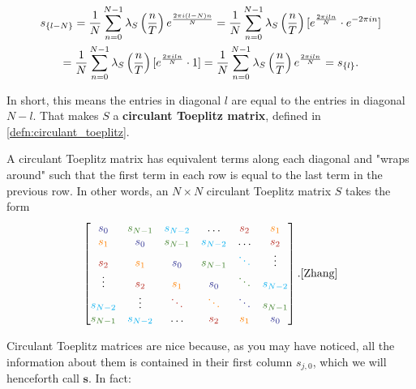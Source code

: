 \begin{multline*}
    s_{\{l-N\}} = \frac{1}{N} \sum_{n=0}^{N-1} \lambda_S\left(\frac{n}{T}\right) e^{\frac{2 \pi i (l-N)n}{N}} = \frac{1}{N} \sum_{n=0}^{N-1} \lambda_S\left(\frac{n}{T}\right)[e^{\frac{2 \pi i ln}{N}}\cdot e^{-2\pi in}] \\= \frac{1}{N} \sum_{n=0}^{N-1} \lambda_S\left(\frac{n}{T}\right)[e^{\frac{2 \pi i ln}{N}}\cdot 1] = \frac{1}{N} \sum_{n=0}^{N-1} \lambda_S\left(\frac{n}{T}\right) e^{\frac{2 \pi i ln}{N}} = s_{\{l\}}.
\end{multline*}

In short, this means the entries in diagonal $l$ are equal to the entries in diagonal $N-l$. That makes $S$ a \textbf{circulant Toeplitz matrix}, defined in \ref{defn:circulant_toeplitz}.

\begin{definition}{A circulant Toeplitz matrix has equivalent terms along each diagonal and "wraps around" such that the first term in each row is equal to the last term in the previous row. In other words, an $N\times N$ circulant Toeplitz matrix $S$ takes the form}
    $$\begin{bmatrix}
        \textcolor{Blue}{s_0} & \textcolor{OliveGreen}{s_{N-1}} & \textcolor{Cyan}{s_{N-2}} & \hdots & \textcolor{BrickRed}{s_2} & \textcolor{orange}{s_1}\\
        \textcolor{orange}{s_1} & \textcolor{Blue}{s_0} & \textcolor{OliveGreen}{s_{N-1}} & \textcolor{Cyan}{s_{N-2}} & \hdots & \textcolor{BrickRed}{s_2}\\
        \textcolor{BrickRed}{s_2} & \textcolor{orange}{s_1} & \textcolor{Blue}{s_0} & \textcolor{OliveGreen}{s_{N-1}} & \textcolor{Cyan}{\ddots} & \vdots\\
        \vdots & \textcolor{BrickRed}{s_2} & \textcolor{orange}{s_1} & \textcolor{Blue}{s_0} & \textcolor{OliveGreen}{\ddots} & \textcolor{Cyan}{s_{N-2}}\\
        \textcolor{Cyan}{s_{N-2}} & \vdots & \textcolor{BrickRed}{\ddots} & \textcolor{orange}{\ddots} & \textcolor{Blue}{\ddots} & \textcolor{OliveGreen}{s_{N-1}}\\
        \textcolor{OliveGreen}{s_{N-1}} & \textcolor{Cyan}{s_{N-2}} & \hdots & \textcolor{BrickRed}{s_2} & \textcolor{orange}{s_1} & \textcolor{Blue}{s_0}
    \end{bmatrix}.\cite{Zhang}$$
    \label{defn:circulant_toeplitz}
\end{definition}

\par \bigskip Circulant Toeplitz matrices are nice because, as you may have noticed, all the information about them is contained in their first column $s_{j,0}$, which we will henceforth call $\mathbf{s}$. In fact:

